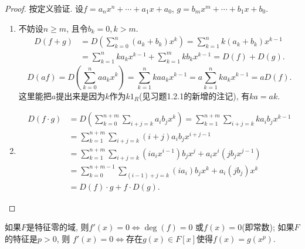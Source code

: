 \documentclass{../solutions-cn}
\begin{document}
\begin{proof}
    按定义验证. 设$f = a_nx^n + \cdots + a_1x + a_0$, $g = b_mx^m + \cdots + b_1x + b_0$.
    \begin{enumerate}[(1)]
        \item 不妨设$n \geqslant m$, 且令$b_k = 0, k > m$.
        \[
        \begin{aligned}
            D(f + g) &= D\left(\sum_{k = 0}^{n} (a_k + b_k)x^k\right) = \sum_{k = 1}^{n} k(a_k + b_k)x^{k - 1}\\ 
            &= \sum_{k = 1}^{n} ka_kx^{k - 1} + \sum_{k = 1}^{m} kb_kx^{k - 1} = D(f) + D(g).
        \end{aligned}
        \]
        \[
            D(af) = D\left(\sum_{k = 0}^{n} aa_kx^k\right) = \sum_{k = 1}^{n} kaa_kx^{k - 1} = a\sum_{k = 1}^{n} ka_kx^{k - 1} = aD(f).
        \]
        这里能把$a$提出来是因为$k$作为$k1_R$(见习题1.2.1的新增的注记), 有$ka = ak$.
        \item \[
            \begin{aligned}
                D(f \cdot g) &= D\left(\sum_{k = 0}^{n + m} \sum_{i + j = k} a_ib_jx^k\right) = \sum_{k = 1}^{n + m} \sum_{i + j = k} ka_ib_jx^{k - 1}\\
                &= \sum_{k = 1}^{n + m} \sum_{i + j = k} (i + j)a_ib_jx^{i + j - 1}\\
                &= \sum_{k = 1}^{n + m} \sum_{i + j = k} (ia_ix^{i - 1})b_jx^j + a_ix^i(jb_jx^{j - 1})\\
                &= \sum_{k = 0}^{n + m - 1} \sum_{(i - 1) + j = k} (ia_i)b_jx^{k} + a_i(jb_j)x^k\\
                &= D(f) \cdot g + f \cdot D(g).
            \end{aligned}
        \]
    \end{enumerate}
\end{proof}

\begin{exercise}[习题2.1.10]
    如果$F$是特征零的域, 则$f'(x) = 0 \Leftrightarrow \deg(f) = 0$
或$f(x) = 0$(即常数); 如果$F$的特征是$p > 0$, 则
$f'(x) = 0 \Leftrightarrow$存在$g(x) \in F[x]$使得$f(x) = g(x^p)$.
\end{exercise}
\end{document}
